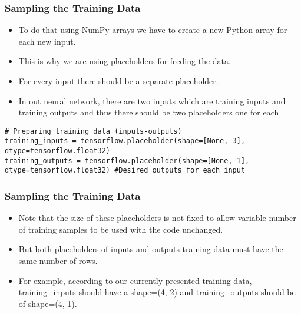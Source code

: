 \begin{frame}[fragile] \frametitle{Sampling the Training Data}

\begin{itemize}
\item To do that using NumPy arrays we have to create a new Python array for each new input.
\item This is why we are using placeholders for feeding the data. 
\item For every input there should be a separate placeholder.
\item In out neural network, there are two inputs which are training inputs and training outputs and thus there should be two placeholders one for each
\end{itemize}
\begin{lstlisting}
# Preparing training data (inputs-outputs)  
training_inputs = tensorflow.placeholder(shape=[None, 3], dtype=tensorflow.float32)  
training_outputs = tensorflow.placeholder(shape=[None, 1], dtype=tensorflow.float32) #Desired outputs for each input 
\end{lstlisting}

\end{frame}

\begin{frame}[fragile] \frametitle{Sampling the Training Data}

\begin{itemize}
\item Note that the size of these placeholders is not fixed to allow variable number of training samples to be used with the code unchanged. 
\item But both placeholders of inputs and outputs training data must have the same number of rows. 
\item For example, according to our currently presented training data, training\_inputs should have a shape=(4, 2) and training\_outputs should be of shape=(4, 1).
\end{itemize}

\end{frame}

